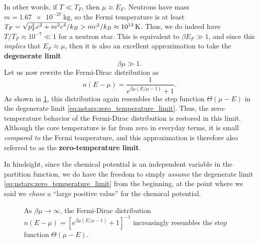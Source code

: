 In other words, if $T \ll T_F$, then $\mu \approx E_F$.
Neutrons have mass $m = \SI{1.67e-27}{\kilogram}$, so the Fermi temperature is at least $T_F = \sqrt{\smash[b]{p_F^2 c^2 + m^2 c^4}} / k_B > m c^2 / k_B \approx \SI{1e13}{\kelvin}$.
Thus, we do indeed have $T / T_F \approx 10^{-7} \ll 1$ for a neutron star.
This is equivalent to $\beta E_F \gg 1$, and since this \emph{implies} that $E_F \approx \mu$, then it is also an excellent approximation to take the \textbf{degenerate limit}
\begin{equation}
	\beta \mu \gg 1 .
\label{eq:nstars:zero_temperature_limit}
\end{equation}
Let us now rewrite the Fermi-Dirac distribution as
\begin{equation}
	n(E-\mu) = \frac{1}{e^{\beta \mu (E/\mu - 1)} + 1} .
\end{equation}
As shown in \cref{fig:nstars:distribution_convergence}, this distribution again resembles the step function $\Theta(\mu - E)$ in the degenerate limit \eqref{eq:nstars:zero_temperature_limit}.
Thus, the zero-temperature behavior of the Fermi-Dirac distribution is restored in this limit.
Although the core temperature is far from zero in everyday terms, it is small \emph{compared to} the Fermi temperature, and this approximation is therefore also referred to as the \textbf{zero-temperature limit}.

In hindsight, since the chemical potential is an independent variable in the partition function, we do have the freedom to simply \emph{assume} the degenerate limit \eqref{eq:nstars:zero_temperature_limit} from the beginning, at the point where we said we \emph{chose} a ``large positive value'' for the chemical potential.

\begin{figure}
	\centering
\caption{\label{fig:nstars:distribution_convergence}
	As $\beta \mu \rightarrow \infty$, the Fermi-Dirac distribution $n(E-\mu) = \left[ e^{\beta \mu \left( E / \mu - 1 \right)} + 1 \right]^{-1}$ increasingly resembles the step function $\Theta (\mu - E)$.
}
\end{figure}

